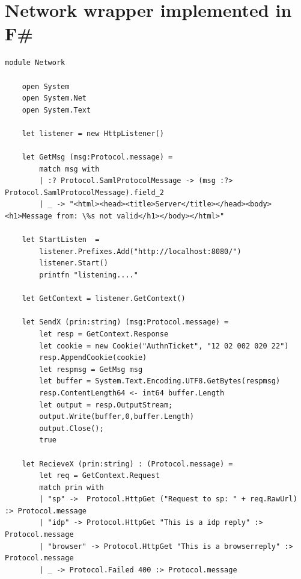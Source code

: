 \documentclass[twosided]{report}
\begin{document}
\section{Network wrapper implemented in F\#}
\begin{lstlisting}[style=fstar, caption={[Example of implementation of network functions in F\#]Example of implementation of network functions in F\# \cite{jacob}.}]
	module Network

	open System
	open System.Net
	open System.Text
	
	let listener = new HttpListener()
	
	let GetMsg (msg:Protocol.message) = 
		match msg with
		| :? Protocol.SamlProtocolMessage -> (msg :?> Protocol.SamlProtocolMessage).field_2
		| _ -> "<html><head><title>Server</title></head><body><h1>Message from: \%s not valid</h1></body></html>"
	
	let StartListen  = 
		listener.Prefixes.Add("http://localhost:8080/")
		listener.Start()
		printfn "listening...."
	
	let GetContext = listener.GetContext()
	
	let SendX (prin:string) (msg:Protocol.message) = 
		let resp = GetContext.Response
		let cookie = new Cookie("AuthnTicket", "12 02 002 020 22")
		resp.AppendCookie(cookie)
		let respmsg = GetMsg msg
		let buffer = System.Text.Encoding.UTF8.GetBytes(respmsg)
		resp.ContentLength64 <- int64 buffer.Length
		let output = resp.OutputStream;
		output.Write(buffer,0,buffer.Length)
		output.Close();
		true
	
	let RecieveX (prin:string) : (Protocol.message) =
		let req = GetContext.Request
		match prin with
		| "sp" ->  Protocol.HttpGet ("Request to sp: " + req.RawUrl) :> Protocol.message
		| "idp" -> Protocol.HttpGet "This is a idp reply" :> Protocol.message
		| "browser" -> Protocol.HttpGet "This is a browserreply" :> Protocol.message
		| _ -> Protocol.Failed 400 :> Protocol.message
\end{lstlisting}
\end{document}
